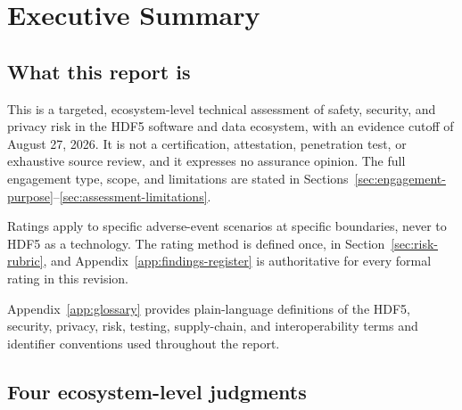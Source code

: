 \documentclass[../main.tex]{subfiles}
\begin{document}
\section*{Executive Summary}
{}
\label{sec:executive-summary}

\subsection*{What this report is}

This is a targeted, ecosystem-level technical assessment of safety, security,
and privacy risk in the HDF5 software and data ecosystem, with an evidence
cutoff of August 27, 2026. It is not a certification, attestation, penetration
test, or exhaustive source review, and it expresses no assurance opinion. The
full engagement type, scope, and limitations are stated in
Sections~\ref{sec:engagement-purpose}--\ref{sec:assessment-limitations}.

Ratings apply to specific adverse-event scenarios at specific boundaries, never
to HDF5 as a technology. The rating method is defined once, in
Section~\ref{sec:risk-rubric}, and Appendix~\ref{app:findings-register} is
authoritative for every formal rating in this revision.

Appendix~\ref{app:glossary} provides plain-language definitions of the HDF5,
security, privacy, risk, testing, supply-chain, and interoperability terms and
identifier conventions used throughout the report.

\subsection*{Four ecosystem-level judgments}
\end{document}
